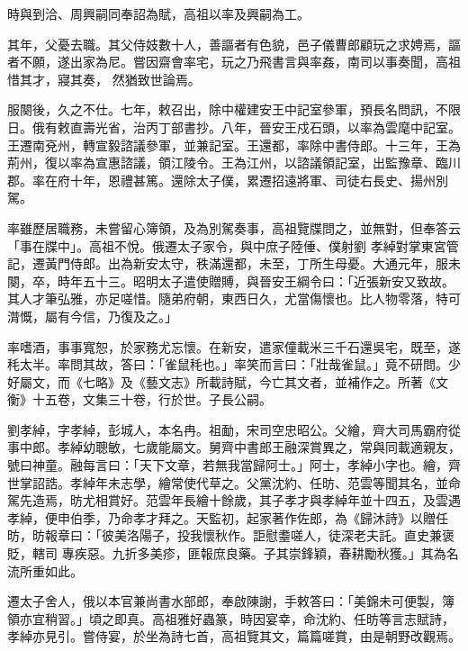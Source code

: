\begin{pinyinscope}
 時與到洽、周興嗣同奉詔為賦，高祖以率及興嗣為工。



 其年，父憂去職。其父侍妓數十人，善謳者有色貌，邑子儀曹郎顧玩之求娉焉，謳者不願，遂出家為尼。嘗因齋會率宅，玩之乃飛書言與率姦，南司以事奏聞，高祖惜其才，寢其奏，
 然猶致世論焉。



 服闋後，久之不仕。七年，敕召出，除中權建安王中記室參軍，預長名問訊，不限日。俄有敕直壽光省，治丙丁部書抄。八年，晉安王戍石頭，以率為雲麾中記室。王遷南兗州，轉宣毅諮議參軍，並兼記室。王還都，率除中書侍郎。十三年，王為荊州，復以率為宣惠諮議，領江陵令。王為江州，以諮議領記室，出監豫章、臨川郡。率在府十年，恩禮甚篤。還除太子僕，累遷招遠將軍、司徒右長史、揚州別駕。



 率雖歷居職務，未嘗留心簿領，及為別駕奏事，高祖覽牒問之，並無對，但奉答云「事在牒中」。高祖不悅。俄遷太子家令，與中庶子陸倕、僕射劉
 孝綽對掌東宮管記，遷黃門侍郎。出為新安太守，秩滿還都，未至，丁所生母憂。大通元年，服未闋，卒，時年五十三。昭明太子遣使贈賻，與晉安王綱令曰：「近張新安又致故。其人才筆弘雅，亦足嗟惜。隨弟府朝，東西日久，尤當傷懷也。比人物零落，特可潸慨，屬有今信，乃復及之。」



 率嗜酒，事事寬恕，於家務尤忘懷。在新安，遣家僮載米三千石還吳宅，既至，遂秏太半。率問其故，答曰：「雀鼠秏也。」率笑而言曰：「壯哉雀鼠。」竟不研問。少好屬文，而《七略》及《藝文志》所載詩賦，今亡其文者，並補作之。所著《文衡》十五卷，文集三十卷，行於世。子長公嗣。



 劉孝綽，字孝綽，彭城人，本名冉。祖勔，宋司空忠昭公。父繪，齊大司馬霸府從事中郎。孝綽幼聰敏，七歲能屬文。舅齊中書郎王融深賞異之，常與同載適親友，號曰神童。融每言曰：「天下文章，若無我當歸阿士。」阿士，孝綽小字也。繪，齊世掌詔誥。孝綽年未志學，繪常使代草之。父黨沈約、任昉、范雲等聞其名，並命駕先造焉，昉尤相賞好。范雲年長繪十餘歲，其子孝才與孝綽年並十四五，及雲遇孝綽，便申伯季，乃命孝才拜之。天監初，起家著作佐郎，為《歸沐詩》以贈任昉，昉報章曰：「彼美洛陽子，投我懷秋作。詎慰耋嗟人，徒深老夫託。直史兼褒貶，轄司
 專疾惡。九折多美疹，匪報庶良藥。子其崇鋒穎，春耕勵秋獲。」其為名流所重如此。



 遷太子舍人，俄以本官兼尚書水部郎，奉啟陳謝，手敕答曰：「美錦未可便製，簿領亦宜稍習。」頃之即真。高祖雅好蟲篆，時因宴幸，命沈約、任昉等言志賦詩，孝綽亦見引。嘗侍宴，於坐為詩七首，高祖覽其文，篇篇嗟賞，由是朝野改觀焉。




\end{pinyinscope}
